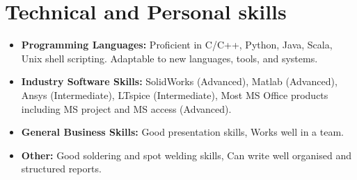 \section{Technical and Personal skills}

\vspace{6pt}

\begin{itemize}

\item \textbf{Programming Languages:} Proficient in C/C++, Python, Java, Scala, Unix shell scripting. Adaptable to new languages, tools, and systems.

\vspace{6pt}

\item \textbf{Industry Software Skills:} SolidWorks (Advanced), Matlab (Advanced), Ansys (Intermediate),  LTspice (Intermediate), Most MS Office products including MS project and MS access (Advanced).

\vspace{6pt}

\item \textbf{General Business Skills:} Good presentation skills, Works well in a team.

\vspace{6pt}

\item \textbf{Other:} Good soldering and spot welding skills, Can write well organised and structured reports.

\end{itemize}

